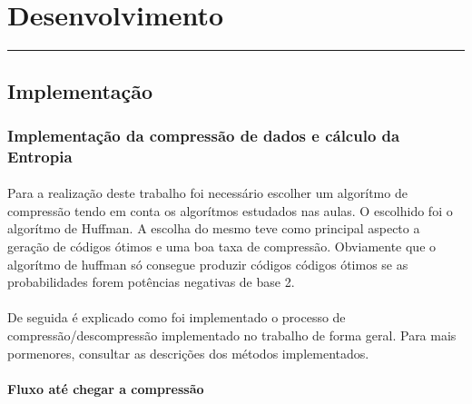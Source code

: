 \documentclass[paper=a4, fontsize=11pt]{scrartcl}
\numberwithin{equation}{section}		%
\numberwithin{figure}{section}			%
\numberwithin{table}{section}				%
\newcommand{\horrule}[1]{\rule{\linewidth}{#1}} 	%
\begin{document}
\pagebreak
    
 

\section{Desenvolvimento}
\horrule{2pt} 
\subsection{Implementação}

\subsubsection{Implementação da compressão de dados e cálculo da Entropia}


\paragraph{} Para a realização deste trabalho foi necessário escolher um algorítmo de compressão tendo em conta os algorítmos estudados nas aulas. O escolhido foi o algorítmo de Huffman. A escolha do mesmo teve como principal aspecto a geração de códigos ótimos e uma boa taxa de compressão. Obviamente que o algorítmo de huffman só consegue produzir códigos códigos ótimos se as probabilidades forem potências negativas de base 2.

\paragraph{} De seguida é explicado como foi implementado o processo de compressão/descompressão implementado no trabalho de forma geral. Para mais pormenores, consultar as descrições dos métodos implementados.


\paragraph{Fluxo até chegar a compressão}
\end{document}
